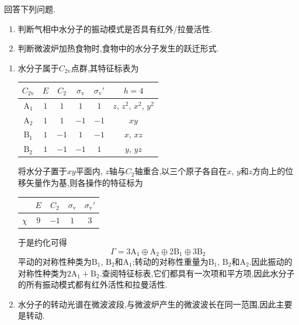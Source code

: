 \documentclass{ctexart}
\begin{document}
\begin{homework}[5.]
    回答下列问题.
    \begin{enumerate}[label=\tbf{(\alph*)}]
        \item 判断气相中水分子的振动模式是否具有红外/拉曼活性.
        \item 判断微波炉加热食物时,食物中的水分子发生的跃迁形式.
    \end{enumerate}
\end{homework}
\begin{solution}
\begin{enumerate}[label=\tbf{(\alph*)}]
    \item 水分子属于$C_{2\text{v}}$点群,其特征标表为
    \begin{table}[H]\centering
    \begin{tabular}{cccccc}\hline
        $C_{2\text{v}}$ & $E$ & $C_2$ & $\sigma_{\text{v}}$ & $\sigma_{\text{v}}'$ & $h=4$ \\\hline
        $\text{A}_1$ & $1$ & $1$ & $1$ & $1$ & $z$, $z^2$, $x^2$, $y^2$ \\\hline
        $\text{A}_2$ & $1$ & $1$ & $-1$ & $-1$ & $xy$ \\\hline
        $\text{B}_1$ & $1$ & $-1$ & $1$ & $-1$ & $x$, $xz$ \\\hline
        $\text{B}_2$ & $1$ & $-1$ & $-1$ & $1$ & $y$, $yz$ \\\hline
    \end{tabular}
    \end{table}
    将水分子置于$xy$平面内, $z$轴与$C_2$轴重合,以三个原子各自在$x$, $y$和$z$方向上的位移矢量作为基,则各操作的特征标为
    \begin{table}[H]\centering
        \begin{tabular}{ccccc}\hline
            & $E$ & $C_2$ & $\sigma_{\text{v}}$ & $\sigma_{\text{v}}'$ \\\hline
            $\chi$ & $9$ & $-1$ & $1$ & $3$\\\hline
        \end{tabular}
    \end{table}
    于是约化可得
    \[\Gamma=3\text{A}_1\oplus\text{A}_2\oplus2\text{B}_1\oplus3\text{B}_2\]
    平动的对称性种类为$\text{B}_1$, $\text{B}_2$和$\text{A}_1$;转动的对称性重量为$\text{B}_1$, $\text{B}_2$和$\text{A}_2$.因此振动的对称性种类为$2\text{A}_1+\text{B}_2$.查阅特征标表,它们都具有一次项和平方项,因此水分子的所有振动模式都有红外活性和拉曼活性.
    \item 水分子的转动光谱在微波波段,与微波炉产生的微波波长在同一范围,因此主要是转动.
\end{enumerate}
\end{solution}
\end{document}

